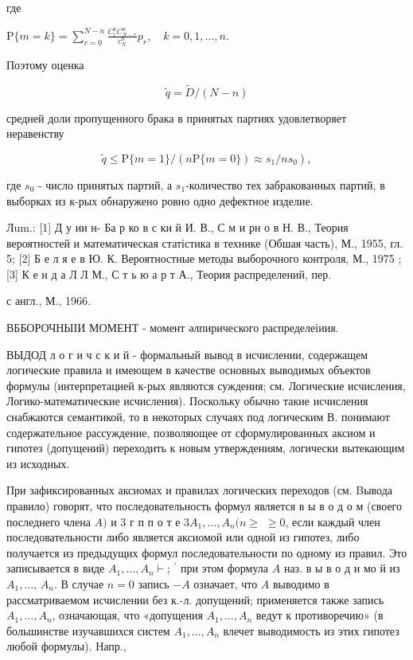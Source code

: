 \documentclass[10pt]{article}
\begin{document}
где



$\mathrm{P}\{m=k\}=\sum_{r=0}^{N-n} \frac{C_{r}^{k} C_{N-r}^{n}}{c_{N}^{n}} p_{r}, \quad k=0,1, \ldots, n$.



Поэтому оценка



\[

\tilde{q}=\tilde{D} /(N-n)

\]



средней доли пропущенного брака в принятых партиях удовлетворяет неравенству



\[

\left.\tilde{q} \leqslant \mathrm{P}\{m=1\} /(n \mathrm{P}\{m=0\}) \approx s_{1} / n s_{0}\right),

\]



где $s_{0}$ - число принятых партий, а $s_{1}$-количество тех забракованных партий, в выборках из к-рых обнаружено ровно одно дефектное изделие.



Лum.: [1] Д у ии н- Ба р ко в с ки й И. В., С м и рн о в Н. В., Теория вероятностей и математическая статістика в технике (Обшая часть), М., 1955, гл. 5; [2] Б е л я е в Ю. К. Вероятностные методы выборочного контроля, М., 1975 ; [3] К е н д а Л Л М., С т ь ю а р т А., Теория распределений, пер.

с англ., М., 1966.



ВББОРОЧНЫІИ МОМЕНТ - момент әлпирического распределеіиия.



ВЫДОД л о г и ч с к и й - формальный вывод в исчислении, содержащем логические правила и имеющем в качестве основных выводимых объектов формулы (интерпретацией к-рых являются суждения; см. Логические исчисления, Логико-математические исчисления). Поскольку обычно такие исчисления снабжаются семантикой, то в некоторых случаях под логическим В. понимают содержательное рассуждение, позволяющее от сформулированных аксиом и гипотез (допущений) переходить к новым утверждениям, логически вытекающим из исходных.



При зафиксированных аксиомах и правилах логических переходов (см. Bывода правило) говорят, что последовательность формул является в ы в о д о м (своего последнего члена $A)$ и 3 г п п о т е $3 A_{1}, \ldots, A_{n}(n \geqslant$ $\geqslant 0$, если каждый член последовательности либо является аксиомой или одной из гипотез, либо получается из предыдущих формул последовательности по одному из правил. Это записывается в виде $A_{1}, \ldots, A_{n} \vdash$; $^{\prime}$ при этом формула $A$ наз. в ы в о д и мо й из $A_{1}, \ldots$, $A_{n}$. В случае $n=0$ запись $-A$ означает, что $A$ выводимо в рассматриваемом исчислении без к.-л. допущений; применяется также запись $A_{1}, \ldots, A_{n}$, означающая, что «допущения $A_{1}, \ldots, A_{n}$ ведут к противоречию» (в большинстве изучавшихся систем $A_{1}, \ldots, A_{n}$ влечет выводимость из этих гипотез любой формулы). Напр.,
\end{document}
